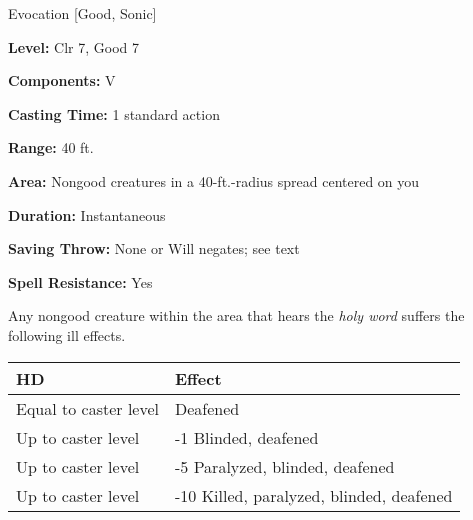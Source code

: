 
Evocation [Good, Sonic]

\textbf{Level:} Clr 7, Good 7

\textbf{Components:} V

\textbf{Casting Time:} 1 standard action

\textbf{Range:} 40 ft.

\textbf{Area:} Nongood creatures in a 40-ft.-radius spread centered on you

\textbf{Duration:} Instantaneous

\textbf{Saving Throw:} None or Will negates; see text

\textbf{Spell Resistance:} Yes

Any nongood creature within the area that hears the \textit{holy word} suffers 
the following ill effects.

\begin{longtable}{llll}
\hline
\multicolumn{1}{|p{1.281in}|}{\begin{minipage}[t]{1.281in}\raggedright
\textbf{HD}\end{minipage}} & \multicolumn{1}{p{2.406in}|}{\begin{minipage}[t]{2.406in}\raggedright
\textbf{Effect}\end{minipage}}\\
\hline
\multicolumn{1}{p{0.069in}|}{\begin{minipage}[t]{0.069in}\raggedright
Equal to caster level\end{minipage}} & \multicolumn{1}{p{0.069in}|}{\begin{minipage}[t]{0.069in}\raggedright
Deafened\end{minipage}}\\
\hline
\multicolumn{1}{|p{1.281in}|}{\begin{minipage}[t]{1.281in}\raggedright
Up to caster level\end{minipage}} & \multicolumn{1}{p{2.406in}|}{\begin{minipage}[t]{2.406in}\raggedright
-1 Blinded, deafened\end{minipage}}\\
\hline
\multicolumn{1}{p{0.069in}|}{\begin{minipage}[t]{0.069in}\raggedright
Up to caster level\end{minipage}} & \multicolumn{1}{p{0.069in}|}{\begin{minipage}[t]{0.069in}\raggedright
-5 Paralyzed, blinded, deafened\end{minipage}}\\
\hline
\multicolumn{1}{|p{1.281in}|}{\begin{minipage}[t]{1.281in}\raggedright
Up to caster level\end{minipage}} & \multicolumn{3}{p{2.545in}|}{\begin{minipage}[t]{2.545in}\raggedright
-10 Killed, paralyzed, blinded, deafened\end{minipage}}\\
\hline
\end{longtable}

